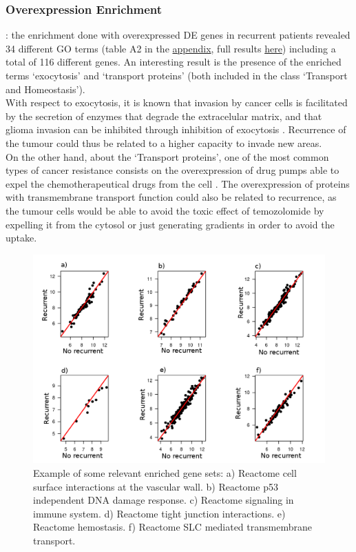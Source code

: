 \documentclass[9pt,twocolumn,twoside]{gsajnl}
\begin{document}
\subsubsection*{Overexpression Enrichment}: the enrichment done with overexpressed DE genes in recurrent patients revealed 34 different GO terms (table A2 in the \href{http://ieoproject.tk/ieo/supplementary/appendix.pdf}{appendix}, full results \href{http://ieoproject.tk/ieo/supplementary/go_overexpr_results.html}{here}) including a total of 116 different genes. An interesting result is the presence of the enriched terms `exocytosis' and `transport proteins' (both included in the class `Transport and Homeostasis').\\
With respect to exocytosis, it is known that invasion by cancer cells is facilitated by the secretion of enzymes that degrade the extracelular matrix, and that glioma invasion can be inhibited through inhibition of exocytosis \citep{Liu2012}. Recurrence of the tumour could thus be related to a higher capacity to invade new areas.\\
On the other hand, about the `Transport proteins', one of the most common types of cancer resistance consists on the overexpression of drug pumps able to expel the chemotherapeutical drugs from the cell \citep{Borst2012}. The overexpression of proteins with transmembrane transport function could also be related to recurrence, as the tumour cells would be able to avoid the toxic effect of temozolomide by expelling it from the cytosol or just generating gradients in order to avoid the uptake.
\begin{figure}[!h]
	\centering
	\includegraphics[scale=0.4]{gsea.png}
	\caption{ Example of some relevant enriched gene sets: a) Reactome cell surface interactions at the vascular wall. b) Reactome p53 independent DNA damage response. c) Reactome signaling in immune system. d) Reactome tight junction interactions. e) Reactome hemostasis. f) Reactome SLC mediated transmembrane transport. }
	\label{fig:gsea}
\end{figure}
\end{document}
